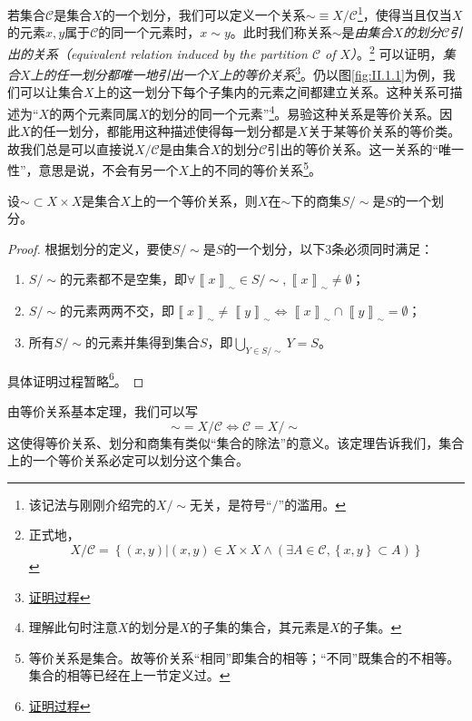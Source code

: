 \documentclass[../main.tex]{subfiles}
\begin{document}
若集合$\mathcal{C}$是集合$X$的一个划分，我们可以定义一个关系$\sim\equiv X/\mathcal{C}$\footnote{该记法与刚刚介绍完的$X/\sim$无关，是符号“$/$”的滥用。}，使得当且仅当$X$的元素$x,y$属于$\mathcal{C}$的同一个元素时，$x\sim y$。此时我们称关系$\sim$是\emph{由集合$X$的划分$\mathcal{C}$引出的关系（equivalent relation induced by the partition $\mathcal{C}$ of $X$）}。\footnote{正式地，
\[
X/\mathcal{C}=\left\{\left(x,y\right)|\left(x,y\right)\in X\times X\wedge\left(\exists A\in \mathcal{C},\left\{x,y\right\}\subset A\right)\right\}
\]
}
可以证明，\emph{集合$X$上的任一划分都唯一地引出一个$X$上的等价关系}\footnote{\href{https://proofwiki.org/wiki/Relation_Induced_by_Partition_is_Equivalence}{证明过程}}。仍以图\ref{fig:II.1.1}为例，我们可以让集合$X$上的这一划分下每个子集内的元素之间都建立关系。这种关系可描述为“$X$的两个元素同属$X$的划分的同一个元素”\footnote{理解此句时注意$X$的划分是$X$的子集的集合，其元素是$X$的子集。}。易验这种关系是等价关系。因此$X$的任一划分，都能用这种描述使得每一划分都是$X$关于某等价关系的等价类。故我们总是可以直接说$X/\mathcal{C}$是由集合$X$的划分$\mathcal{C}$引出的等价关系。这一关系的“唯一性”，意思是说，不会有另一个$X$上的不同的等价关系\footnote{等价关系是集合。故等价关系“相同”即集合的相等；“不同”既集合的不相等。集合的相等已经在上一节定义过。}。

\begin{theorem}[等价关系基本定理]
设$\sim\subset X\times X$是集合$X$上的一个等价关系，则$X$在$\sim$下的商集$S/\sim$是$S$的一个划分。
\end{theorem}
\begin{proof}
根据划分的定义，要使$S/\sim$是$S$的一个划分，以下3条必须同时满足：
\begin{enumerate}
    \item $S/\sim$的元素都不是空集，即$\forall\left\llbracket x\right\rrbracket_\sim\in S/\sim,\left\llbracket x\right\rrbracket_\sim\neq\emptyset$；
    \item $S/\sim$的元素两两不交，即$\left\llbracket x\right\rrbracket_\sim\neq\left\llbracket y\right\rrbracket_\sim\Leftrightarrow\left\llbracket x\right\rrbracket_\sim\cap\left\llbracket y\right\rrbracket_\sim=\emptyset$；
    \item 所有$S/\sim$的元素并集得到集合$S$，即$\bigcup_{Y\in S/\sim}Y=S$。
\end{enumerate}
具体证明过程暂略\footnote{\href{https://proofwiki.org/wiki/Fundamental_Theorem_on_Equivalence_Relations}{证明过程}}。
\end{proof}

由等价关系基本定理，我们可以写
\[
\sim=X/\mathcal{C}\Leftrightarrow \mathcal{C}=X/\sim
\]
这使得等价关系、划分和商集有类似“集合的除法”的意义。该定理告诉我们，集合上的一个等价关系必定可以划分这个集合。
\end{document}
